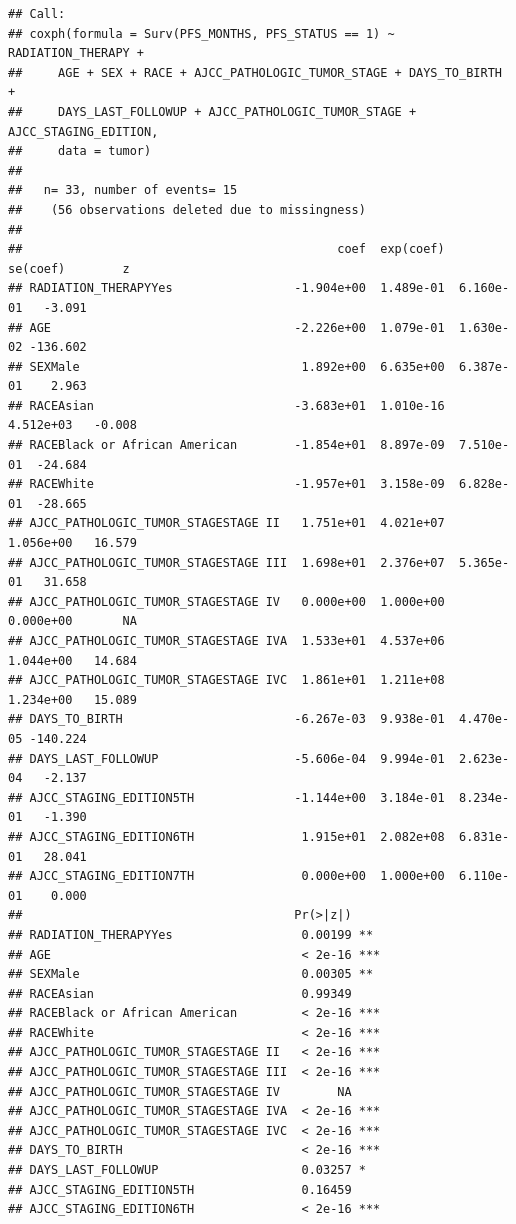 \documentclass[
  11pt,
]{article}
\begin{document}
\begin{verbatim}
## Call:
## coxph(formula = Surv(PFS_MONTHS, PFS_STATUS == 1) ~ RADIATION_THERAPY + 
##     AGE + SEX + RACE + AJCC_PATHOLOGIC_TUMOR_STAGE + DAYS_TO_BIRTH + 
##     DAYS_LAST_FOLLOWUP + AJCC_PATHOLOGIC_TUMOR_STAGE + AJCC_STAGING_EDITION, 
##     data = tumor)
## 
##   n= 33, number of events= 15 
##    (56 observations deleted due to missingness)
## 
##                                            coef  exp(coef)   se(coef)        z
## RADIATION_THERAPYYes                 -1.904e+00  1.489e-01  6.160e-01   -3.091
## AGE                                  -2.226e+00  1.079e-01  1.630e-02 -136.602
## SEXMale                               1.892e+00  6.635e+00  6.387e-01    2.963
## RACEAsian                            -3.683e+01  1.010e-16  4.512e+03   -0.008
## RACEBlack or African American        -1.854e+01  8.897e-09  7.510e-01  -24.684
## RACEWhite                            -1.957e+01  3.158e-09  6.828e-01  -28.665
## AJCC_PATHOLOGIC_TUMOR_STAGESTAGE II   1.751e+01  4.021e+07  1.056e+00   16.579
## AJCC_PATHOLOGIC_TUMOR_STAGESTAGE III  1.698e+01  2.376e+07  5.365e-01   31.658
## AJCC_PATHOLOGIC_TUMOR_STAGESTAGE IV   0.000e+00  1.000e+00  0.000e+00       NA
## AJCC_PATHOLOGIC_TUMOR_STAGESTAGE IVA  1.533e+01  4.537e+06  1.044e+00   14.684
## AJCC_PATHOLOGIC_TUMOR_STAGESTAGE IVC  1.861e+01  1.211e+08  1.234e+00   15.089
## DAYS_TO_BIRTH                        -6.267e-03  9.938e-01  4.470e-05 -140.224
## DAYS_LAST_FOLLOWUP                   -5.606e-04  9.994e-01  2.623e-04   -2.137
## AJCC_STAGING_EDITION5TH              -1.144e+00  3.184e-01  8.234e-01   -1.390
## AJCC_STAGING_EDITION6TH               1.915e+01  2.082e+08  6.831e-01   28.041
## AJCC_STAGING_EDITION7TH               0.000e+00  1.000e+00  6.110e-01    0.000
##                                      Pr(>|z|)    
## RADIATION_THERAPYYes                  0.00199 ** 
## AGE                                   < 2e-16 ***
## SEXMale                               0.00305 ** 
## RACEAsian                             0.99349    
## RACEBlack or African American         < 2e-16 ***
## RACEWhite                             < 2e-16 ***
## AJCC_PATHOLOGIC_TUMOR_STAGESTAGE II   < 2e-16 ***
## AJCC_PATHOLOGIC_TUMOR_STAGESTAGE III  < 2e-16 ***
## AJCC_PATHOLOGIC_TUMOR_STAGESTAGE IV        NA    
## AJCC_PATHOLOGIC_TUMOR_STAGESTAGE IVA  < 2e-16 ***
## AJCC_PATHOLOGIC_TUMOR_STAGESTAGE IVC  < 2e-16 ***
## DAYS_TO_BIRTH                         < 2e-16 ***
## DAYS_LAST_FOLLOWUP                    0.03257 *  
## AJCC_STAGING_EDITION5TH               0.16459    
## AJCC_STAGING_EDITION6TH               < 2e-16 ***

\end{verbatim}
\end{document}
